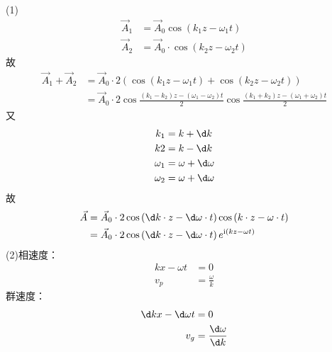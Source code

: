\documentclass{phyasgn}
\renewcommand{\i}{\mathrm{i}}
\begin{document}
\begin{sol}[1]
    (1)\begin{align*}
        \vec{A}_1&=\vec{A}_0\cos\left(k_1z-\omega_1 t\right)\\
        \vec{A}_2&=\vec{A}_0\cdot\cos\left(k_2z-\omega_2 t\right)
    \end{align*}
    故
    \begin{align*}
        \vec{A}_1+\vec{A}_2&=\vec{A}_0\cdot2\left(\cos\left(k_1z-\omega_1 t\right)+\cos\left(k_2z-\omega_2 t\right)\right)\\
        &=\vec{A}_0\cdot2\cos\frac{\left(k_1-k_2\right)z-\left(\omega_1-\omega_2\right)t}{2}\cos\frac{\left(k_1+k_2\right)z-\left(\omega_1+\omega_2\right)t}{2}
    \end{align*}
    又
    \begin{align*}
        k_1&=k+\d k\\
        k2&=k-\d k\\
        \omega_1&=\omega+\d \omega\\
        \omega_2&=\omega+\d \omega
    \end{align*}
    故
    \begin{align*}
        \vec{A}&=\vec{A}_0\cdot2\cos\left(\d k\cdot z-\d \omega\cdot t\right)\cos\left(k\cdot z-\omega\cdot t\right)\\
        &=\vec{A}_0\cdot2\cos\left(\d k\cdot z-\d \omega\cdot t\right)e^{\i \left(kz-\omega t\right)}
    \end{align*}
    (2)相速度：
    \begin{align*}
        kx-\omega t&=0\\
        v_p&=\frac{\omega}{k}
    \end{align*}
    群速度：
    \begin{align*}
        \d kx-\d \omega t&=0\\
        v_g&=\frac{\d \omega}{\d k}
    \end{align*}
\end{sol}
\end{document}
